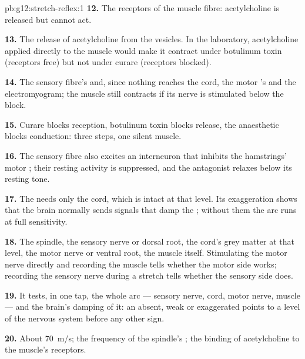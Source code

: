 \begin{solution}{pb:g12:stretch-reflex:1}
\textbf{12.} The receptors of the muscle fibre: acetylcholine is
released but cannot act.

\textbf{13.} The release of acetylcholine from the vesicles. In the
laboratory, acetylcholine applied directly to the muscle would make it
contract under botulinum toxin (receptors free) but not under curare
(receptors blocked).

\textbf{14.} The sensory fibre's  and, since nothing
reaches the cord, the motor 's and the electromyogram; the
muscle still contracts if its nerve is stimulated below the block.

\textbf{15.} Curare blocks reception, botulinum toxin blocks release,
the anaesthetic blocks conduction: three steps, one silent muscle.

\textbf{16.} The sensory fibre also excites an interneuron that
inhibits the hamstrings' motor ; their resting activity is
suppressed, and the antagonist relaxes below its resting tone.

\textbf{17.} The  needs only the cord, which is intact at that
level. Its exaggeration shows that the brain normally sends signals
that damp the ; without them the arc runs at full sensitivity.

\textbf{18.} The spindle, the sensory nerve or dorsal root, the cord's
grey matter at that level, the motor nerve or ventral root, the muscle
itself. Stimulating the motor nerve directly and recording the muscle
tells whether the motor side works; recording the sensory nerve during
a stretch tells whether the sensory side does.

\textbf{19.} It tests, in one tap, the whole arc --- sensory nerve,
cord, motor nerve, muscle --- and the brain's damping of it: an absent,
weak or exaggerated  points to a level of the nervous system
before any other sign.

\textbf{20.} About \qty{70}{m/s}; the frequency of the spindle's
; the binding of acetylcholine to the muscle's
receptors.
\end{solution}
